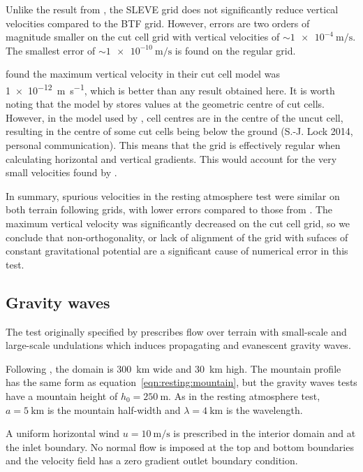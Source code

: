 \documentclass{ametsoc}
\begin{document}
Unlike the result from \citet{klemp2011}, the SLEVE grid does not significantly reduce vertical velocities compared to the BTF grid.  However, errors are two orders of magnitude smaller on the cut cell grid with vertical velocities of \(\sim \SI{1e-4}{\meter\per\second}\).  The smallest error of \(\sim \SI{1e-10}{\meter\per\second}\) is found on the regular grid.

\citet{good2014} found the maximum vertical velocity in their cut cell model was \SI{1e-12}{\meter\per\second}, which is better than any result obtained here.  It is worth noting that the model by \citet{weller-shahrokhi2014} stores values at the geometric centre of cut cells.  However, in the model used by \citet{good2014}, cell centres are in the centre of the uncut cell, resulting in the centre of some cut cells being below the ground (S.-J. Lock 2014, personal communication).  This means that the grid is effectively regular when calculating horizontal and vertical gradients.  This would account for the very small velocities found by \citet{good2014}.

In summary, spurious velocities in the resting atmosphere test were similar on both terrain following grids, with lower errors compared to those from \citet{klemp2011}.  The maximum vertical velocity was significantly decreased on the cut cell grid, so we conclude that non-orthogonality, or lack of alignment of the grid with sufaces of constant gravitational potential are a significant cause of numerical error in this test.


\subsection{Gravity waves}
\label{sec:gw}
The test originally specified by \citet{schaer2002} prescribes flow over terrain with small-scale and large-scale undulations which induces propagating and evanescent gravity waves.

Following \citet{melvin2010}, the domain is \SI{300}{\kilo\meter} wide and \SI{30}{\kilo\meter} high.
The mountain profile has the same form as equation~\ref{eqn:resting:mountain}, but the gravity waves tests have a mountain height of $h_0 = \SI{250}{\meter}$.  As in the resting atmosphere test, $a = \SI{5}{\kilo\meter}$ is the mountain half-width and $\lambda = \SI{4}{\kilo\meter}$ is the wavelength.

A uniform horizontal wind $u = \SI{10}{\meter\per\second}$ is prescribed in the interior domain and at the inlet boundary.  No normal flow is imposed at the top and bottom boundaries and the velocity field has a zero gradient outlet boundary condition.
\end{document}
